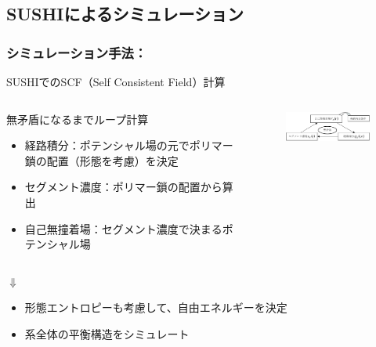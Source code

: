 \documentclass[unicode,12pt]{beamer}%
\begin{document}
\subsection{SUSHIによるシミュレーション}
\begin{frame}
	\frametitle{シミュレーション手法：}
	SUSHIでのSCF（Self Consistent Field）計算
		\begin{columns}
			\begin{column}{6.0cm}
				{\scriptsize
				\begin{block}{無矛盾になるまでループ計算}
				\begin{itemize}
					\item 経路積分：ポテンシャル場の元でポリマー鎖の配置（形態を考慮）を決定
					\item セグメント濃度：ポリマー鎖の配置から算出
					\item 自己無撞着場：セグメント濃度で決まるポテンシャル場
				\end{itemize}
				\end{block}
				}
			\end{column}
			\begin{column}{6.0cm}
				\begin{figure}[!b]
					\begin{center}
						\includegraphics[width=60mm]{scf.png}
					\end{center}
				\end{figure}
			\end{column}
		\end{columns}

		\begin{center}
			{\Large $\Downarrow$}
		\end{center}

		\begin{itemize}
			\item \color{red}形態エントロピーも考慮\color{black}して、自由エネルギーを決定
			\item 系全体の\color{red}平衡構造\color{black}をシミュレート
		\end{itemize}
\end{frame}
%
\end{document}
